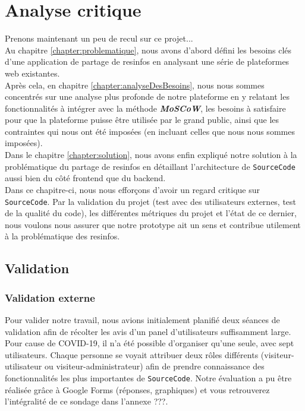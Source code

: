 \chapter{Analyse critique}

Prenons maintenant un peu de recul sur ce projet...\\

Au chapitre \ref{chapter:problematique}, nous avons d'abord défini les besoins clés d'une application de partage de \glspl{resinfo} en analysant une série de plateformes web existantes.\\

Après cela, en chapitre \ref{chapter:analyseDesBesoins}, nous nous sommes concentrés sur une analyse plus profonde de notre plateforme en y relatant les fonctionnalités à intégrer avec la méthode \textbf{\textit{MoSCoW}}, les besoins à satisfaire pour que la plateforme puisse être utilisée par le grand public, ainsi que les contraintes qui nous ont été imposées (en incluant celles que nous nous sommes imposées).\\

Dans le chapitre \ref{chapter:solution}, nous avons enfin expliqué notre solution à la problématique du partage de \glspl{resinfo} en détaillant l'architecture de \texttt{SourceCode} aussi bien du côté \gls{frontend} que du \gls{backend}.\\

Dans ce chapitre-ci, nous nous efforçons d'avoir un regard critique sur \texttt{SourceCode}. Par la validation du projet (test avec des utilisateurs externes, test de la qualité du code), les différentes métriques du projet et l'état de ce dernier, nous voulons nous assurer que notre prototype ait un sens et contribue utilement à la problématique des \glspl{resinfo}.

\section{Validation}
\label{section:validation}

\subsection{Validation externe}

Pour valider notre travail, nous avions initialement planifié deux séances de validation afin de récolter les avis d'un panel d'utilisateurs suffisamment large.
Pour cause de COVID-19, il n'a été possible d'organiser qu'une seule, avec sept utilisateurs. Chaque personne se voyait attribuer deux rôles différents (visiteur-utilisateur ou visiteur-administrateur) afin de prendre connaissance des fonctionnalités les plus importantes de \texttt{SourceCode}. Notre évaluation a pu être réalisée grâce à Google Forms (réponses, graphiques) et vous retrouverez l'intégralité de ce sondage dans l'annexe ???.\\


